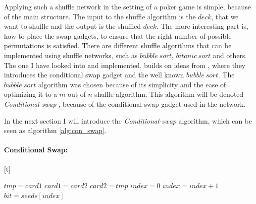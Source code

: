 \documentclass[twoside,11pt,openright]{report}
\newcommand{\CS}{\textit{Conditional-swap} }
\begin{document}
Applying such a shuffle network in the setting of a poker game is simple, because of the main structure. The input to the shuffle algorithm is the $deck$, that we want to shuffle and the output is the shuffled $deck$. The more interesting part is, how to place the swap gadgets, to ensure that the right number of possible permutations is satisfied. There are different shuffle algorithms that can be implemented using shuffle networks, such as $bubble~sort$, $bitonic~sort$ and others. The one I have looked into and implemented, builds on ideas from \cite{psi}, where they introduces the conditional swap gadget and the well known $bubble~sort$. The $bubble~sort$ algorithm was chosen because of its simplicity and the ease of optimizing it to a $m$ out of $n$ shuffle algorithm. This algorithm will be denoted \CS, because of the conditional swap gadget used in the network.

\bigskip

In the next section I will introduce the \CS algorithm, which can be seen as algorithm \ref{alg:con_swap}.

\bigskip

\paragraph{Conditional Swap:}[t]
\label{sec:con_swap}

\begin{algorithm}[t]
\caption{\textbf{\textit{Conditional swap}} \newline
    $deck$ is initialized to hold $n$ cards $c$. \newline
    $seed$ is initialized to hold $\frac{n^2}{2}$ random $bit$ values where $bit_i\in[0,1]$ for $i\in [1,\frac{n^2}{2}]$.
}
\label{alg:con_swap}

\begin{algorithmic}[1]
\State $tmp = card1$
\State $card1 = card2$
\State $card2 = tmp$
\EndIf
\EndFunction
\State
{}
\State $index = 0$
\State $index = index + 1$
\State $bit = seeds[index]$
\State {}
\EndFor
\EndFor
\EndFunction
\end{algorithmic}
\end{algorithm}
\end{document}
